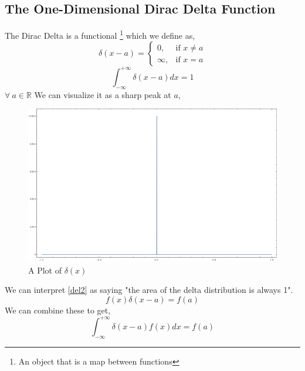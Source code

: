 \documentclass[]{article}
\begin{document}
\subsection{The One-Dimensional Dirac Delta Function}
The Dirac Delta is a functional \footnote{An object that is a map between functions} which we define as,
\begin{equation}
	\delta(x-a)= 
	\begin{cases}
		0, & \text{if } x \neq a\\
		\infty,              & \text{if } x = a
	\end{cases}
	\label{del1}
\end{equation}
\begin{equation}
	\int_{- \infty}^{+ \infty} \delta(x-a) dx = 1
	\label{del2}
\end{equation}
$\forall \  a \in \mathbb{R}$
We can visualize it as a sharp peak at $a$,
\begin{figure}
	\centering
	\includegraphics[scale=0.5]{delta-distribution.png}
	\caption{A Plot of $\delta(x)$}
\end{figure}
We can interpret \ref{del2} as saying "the area of the delta distribution is always 1".
\begin{equation}
	f(x)\delta(x - a ) = f(a)
\end{equation}
We can combine these to get,
\begin{equation}
	\int_{- \infty}^{+ \infty} \delta(x-a) f(x) dx = f(a)
\end{equation}
\end{document}

